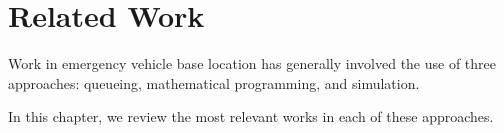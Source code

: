\chapter{Related Work}
\label{ch:RelatedWork}
Work in emergency vehicle base location
has generally involved the use of three approaches:
queueing,
mathematical programming,
and simulation.

In this chapter,
we review
the most relevant works
in each of these approaches.




